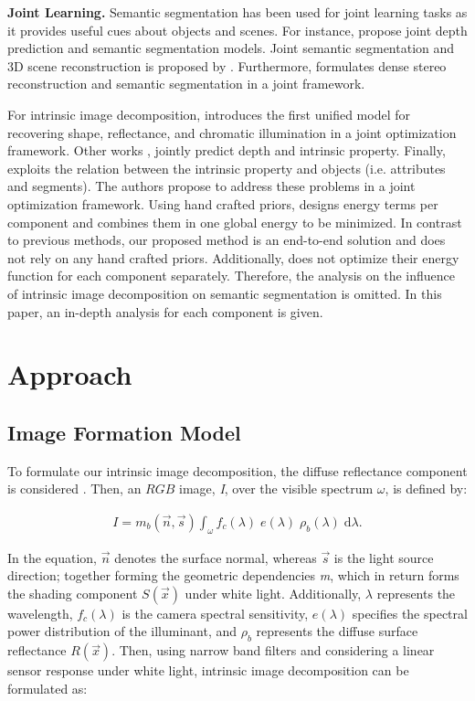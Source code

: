 \documentclass[runningheads]{llncs}
\begin{document}
\noindent \textbf{Joint Learning.} Semantic segmentation has been used for joint learning tasks as it provides useful cues about objects and scenes. For instance, \cite{jafari,eigen,mousavian} propose joint depth prediction and semantic segmentation models. Joint semantic segmentation and 3D scene reconstruction is proposed by \cite{kundu}. Furthermore, \cite{ladicky} formulates dense stereo reconstruction and semantic segmentation in a joint framework.

For intrinsic image decomposition, \cite{barron} introduces the first unified model for recovering shape, reflectance, and chromatic illumination in a joint optimization framework. Other works \cite{kim2,shelhamer}, jointly predict depth and intrinsic property. Finally, \cite{vineet} exploits the relation between the intrinsic property and objects (i.e. attributes and segments). The authors propose to address these problems in a joint optimization framework. Using hand crafted priors, \cite{vineet} designs energy terms per component and combines them in one global energy to be minimized. In contrast to previous methods, our proposed method is an end-to-end solution and does not rely on any hand crafted priors. Additionally, \cite{vineet} does not optimize their energy function for each component separately. Therefore, the analysis on the influence of intrinsic image decomposition on semantic segmentation is omitted. In this paper, an in-depth analysis for each component is given.

\section{Approach}

\subsection{Image Formation Model}
To formulate our intrinsic image decomposition, the diffuse reflectance component is considered \cite{shafer}. Then, an $RGB$ image, \textit{I}, over the visible spectrum $\omega$, is defined by:

\begin{equation} \label{eq:brdf2}
\begin{aligned}
I = m_b(\vec{n}, \vec{s}) \int_{\omega}^{} f_{c}(\lambda)\;e(\lambda)\;\rho_{b}(\lambda)\; \mathrm{d}\lambda .
\end{aligned}
\end{equation}

\noindent In the equation, $\vec{n}$ denotes the surface normal, whereas $\vec{s}$ is the light source direction; together forming the geometric dependencies \textit{m}, which in return forms the shading component $S(\vec{x})$ under white light. Additionally, $\lambda$ represents the wavelength, $f_{c}(\lambda)$ is the camera spectral sensitivity, $e(\lambda)$ specifies the spectral power distribution of the illuminant, and $\rho_{b}$ represents the diffuse surface reflectance $R(\vec{x})$. Then, using narrow band filters and considering a linear sensor response under white light, intrinsic image decomposition can be formulated as:
\end{document}
